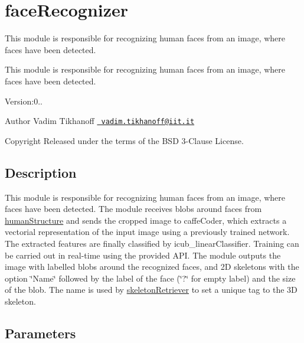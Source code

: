 \section{face\+Recognizer}
\label{group__faceRecognizer}


This module is responsible for recognizing human faces from an image, where faces have been detected.  


This module is responsible for recognizing human faces from an image, where faces have been detected. 

Version\+:0.. \begin{DoxyAuthor}{Author}
Vadim Tikhanoff \href{mailto:vadim.tikhanoff@iit.it}{\texttt{ vadim.\+tikhanoff@iit.\+it}} ~\newline
 
\end{DoxyAuthor}
\begin{DoxyCopyright}{Copyright}
Released under the terms of the B\+SD 3-\/Clause License. 
\end{DoxyCopyright}
\hypertarget{group__skeletonViewer_intro_sec}{}\subsection{Description}\label{group__skeletonViewer_intro_sec}
This module is responsible for recognizing human faces from an image, where faces have been detected. The module receives blobs around faces from \mbox{\hyperlink{group__humanStructure}{human\+Structure}} and sends the cropped image to caffe\+Coder, which extracts a vectorial representation of the input image using a previously trained network. The extracted features are finally classified by icub\+\_\+linear\+Classifier. Training can be carried out in real-\/time using the provided A\+PI. The module outputs the image with labelled blobs around the recognized faces, and 2D skeletons with the option \char`\"{}\+Name\char`\"{} followed by the label of the face (\char`\"{}?\char`\"{} for empty label) and the size of the blob. The name is used by \mbox{\hyperlink{group__skeletonRetriever}{skeleton\+Retriever}} to set a unique tag to the 3D skeleton.\hypertarget{group__skeletonViewer_parameters_sec}{}\subsection{Parameters}\label{group__skeletonViewer_parameters_sec}


